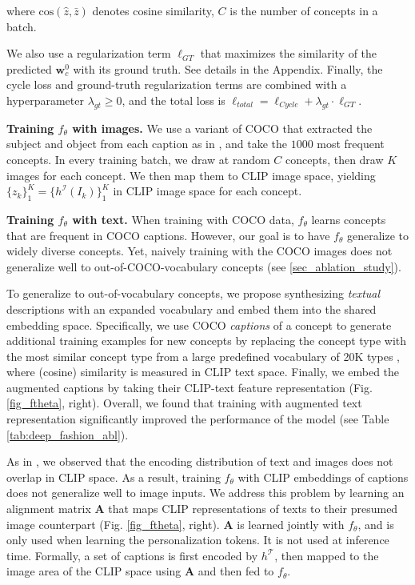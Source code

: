 \documentclass[runningheads]{llncs}
\newcommand{\figref}[1]{Fig. \ref{#1}}
\newcommand\edit[1]{#1}
\newcommand{\cossim}[2]{\text{cos}(#1, #2)}
\renewcommand\vec[1]{\mathbf{#1}}
\newcommand{\ftheta}{f_\theta}
\newcommand{\A}{\vec{A}}
\newcommand{\w}{\vec{w}}
\newcommand{\CLIPI}{h^{\mathcal{I}}}
\newcommand{\CLIPT}{h^{\mathcal{T}}}
\newcommand{\img}{I}
\begin{document}
\normalsize
\noindent where $\cossim{\hat{z}}{\bar{z}}$ denotes cosine similarity, $C$ is the number of concepts in a batch. 

\edit{We also use a regularization term $\ell_{GT}$ that maximizes the similarity of the predicted $\w^0_c$ with its ground truth. See details in the Appendix.}
\edit{Finally, the cycle loss and ground-truth regularization terms are combined with a  hyperparameter $\lambda_{gt}\geq 0$, and the total loss is $\ell_{total} = \ell_{Cycle} + \lambda_{gt} \cdot \ell_{GT}$.}

\textbf{Training $\ftheta$ with images.} We use a variant of COCO  \cite{lin2014microsoft} that extracted the subject and object from each caption as in \cite{atzmon2016learning}, and take the $1000$ most frequent concepts. In every training batch, we draw at random $C$ concepts, then draw $K$ images for each concept. We then map them to CLIP image space, yielding $\{z_k\}_1^K =\{\CLIPI(\img_k)\}_1^K$ in CLIP image space for each concept.

\textbf{Training $\ftheta$ with text.}
When training with COCO data, $\ftheta$ learns concepts that are frequent in COCO captions. However, our goal is to have $\ftheta$ generalize to widely diverse concepts.
Yet, naively training with the COCO images does not generalize well to out-of-COCO-vocabulary concepts (see \ref{sec_ablation_study}).

To generalize to out-of-vocabulary concepts, we propose synthesizing \emph{textual} descriptions with an expanded vocabulary
and embed them into the shared embedding space. Specifically, we use COCO \textit{captions} of a concept to generate additional training examples for new concepts by replacing the concept type with the most similar concept type from a large predefined vocabulary of 20K types \cite{kuznetsova2020open}, where (cosine) similarity is measured in CLIP text space. Finally, we embed the augmented captions by taking their CLIP-text feature representation (\figref{fig_ftheta}, right). Overall, we found that training with augmented text representation significantly improved the performance of the model (see Table \ref{tab:deep_fashion_abl}).




As in \cite{MindtheGap}, we observed that the encoding distribution of text and images does not overlap in CLIP space. As a result, training $\ftheta$ with CLIP embeddings of captions does not generalize well to image inputs. We address this problem by learning an alignment matrix $\A$ that maps CLIP representations of texts to their presumed image counterpart (\figref{fig_ftheta}, right). $\A$ is learned jointly with $\ftheta$\edit{, and is only used when learning the personalization tokens. It is not used at inference time.} Formally, a set of captions is first encoded by $\CLIPT$, then mapped to the image area of the CLIP space using $\A$ and then fed to $\ftheta$.
\end{document}
